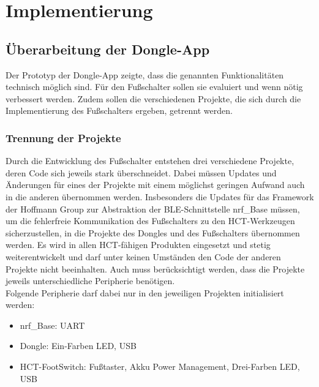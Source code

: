 \section{Implementierung}

\subsection{Überarbeitung der Dongle-App}
Der Prototyp der Dongle-App zeigte, dass die genannten Funktionalitäten technisch möglich sind. Für den Fußschalter sollen sie evaluiert und wenn nötig verbessert werden. Zudem sollen die verschiedenen Projekte, die sich durch die Implementierung des Fußschalters ergeben, getrennt werden.

\subsubsection{Trennung der Projekte}
Durch die Entwicklung des Fußschalter entstehen drei verschiedene Projekte, deren Code sich jeweils stark überschneidet. Dabei müssen Updates und Änderungen für eines der Projekte mit einem möglichst geringen Aufwand auch in die anderen übernommen werden. Insbesonders die Updates für das Framework der Hoffmann Group zur Abstraktion der \ac{BLE}-Schnittstelle nrf\_Base müssen, um die fehlerfreie Kommunikation des Fußschalters zu den \ac{HCT}-Werkzeugen sicherzustellen, in die Projekte des Dongles und des Fußschalters übernommen werden. Es wird in allen \ac{HCT}-fähigen Produkten eingesetzt und stetig weiterentwickelt und darf unter keinen Umständen den Code der anderen Projekte nicht beeinhalten. Auch muss berücksichtigt werden, dass die Projekte jeweils unterschiedliche Peripherie benötigen.\\
Folgende Peripherie darf dabei nur in den jeweiligen Projekten initialisiert werden:
\begin{itemize}
	\item nrf\_Base: \ac{UART}
	\item Dongle: Ein-Farben LED, \ac{USB}
	\item \ac{HCT}-FootSwitch: Fußtaster, Akku Power Management, Drei-Farben LED, \ac{USB}
\end{itemize}

